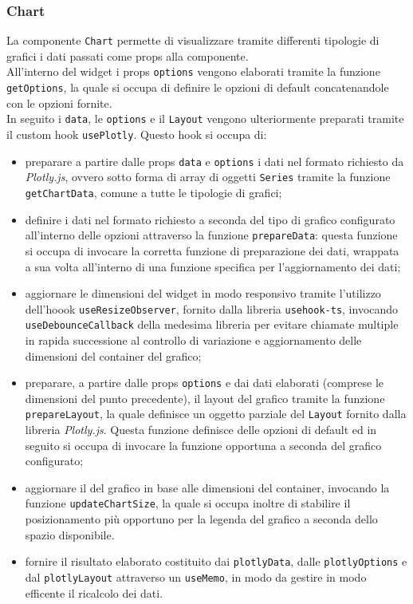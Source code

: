 \subsubsection{Chart}
La componente \texttt{Chart} permette di visualizzare tramite differenti tipologie di grafici i dati passati come props alla componente. \\
All'interno del widget i props \texttt{options} vengono elaborati tramite la funzione \texttt{getOptions}, la quale si occupa di definire le opzioni di
default concatenandole con le opzioni fornite. \\
In seguito i \texttt{data}, le \texttt{options} e il \texttt{Layout} vengono ulteriormente preparati tramite il custom hook \texttt{usePlotly}. Questo hook si
occupa di:
\begin{itemize}
    \item preparare a partire dalle props \texttt{data} e \texttt{options} i dati nel formato richiesto da \textit{Plotly.js}, ovvero sotto forma di array di oggetti
          \texttt{Series} tramite la funzione \texttt{getChartData}, comune a tutte le tipologie di grafici;
    \item definire i dati nel formato richiesto a seconda del tipo di grafico configurato all'interno delle opzioni attraverso la funzione \texttt{prepareData}:
          questa funzione si occupa di invocare la corretta funzione di preparazione dei dati, wrappata a sua volta all'interno di una funzione specifica per l'aggiornamento
          dei dati;
    \item aggiornare le dimensioni del widget in modo responsivo tramite l'utilizzo dell'hoook \texttt{useResizeObserver}, fornito dalla libreria \texttt{usehook-ts},
          invocando \texttt{useDebounceCallback} della medesima libreria per evitare chiamate multiple in rapida successione al controllo di variazione e aggiornamento
          delle dimensioni del container del grafico;
    \item preparare, a partire dalle props \texttt{options} e dai dati elaborati (comprese le dimensioni del punto precedente), il layout del grafico tramite la funzione
          \texttt{prepareLayout}, la quale definisce un oggetto parziale del \texttt{Layout} fornito dalla libreria \textit{Plotly.js}. Questa funzione definisce delle opzioni
          di default ed in seguito si occupa di invocare la funzione opportuna a seconda del grafico configurato;
    \item aggiornare il  del grafico in base alle dimensioni del container, invocando la funzione \texttt{updateChartSize}, la quale si occupa inoltre di stabilire
          il posizionamento più opportuno per la legenda del grafico a seconda dello spazio disponibile.
    \item fornire il risultato elaborato costituito dai \texttt{plotlyData}, dalle \texttt{plotlyOptions} e dal \texttt{plotlyLayout} attraverso un \texttt{useMemo}, in modo da
          gestire in modo efficente il ricalcolo dei dati.
\end{itemize}
